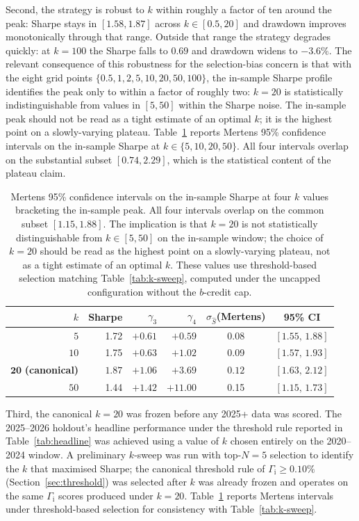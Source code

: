\documentclass[11pt]{article}
\theoremstyle{definition}
\theoremstyle{remark}
\newcommand{\GROUND}{\Gamma_{\mathrm{i}}}
\begin{document}
Second, the strategy is robust to $k$ within roughly a factor of
ten around the peak: Sharpe stays in $[1.58, 1.87]$ across $k
\in [0.5, 20]$ and drawdown improves monotonically through that
range. Outside that range the strategy degrades quickly: at $k =
100$ the Sharpe falls to $0.69$ and drawdown widens to $-3.6\%$.
The relevant consequence of this robustness for the
selection-bias concern is that with the eight grid points
$\{0.5, 1, 2, 5, 10, 20, 50, 100\}$, the in-sample Sharpe
profile identifies the peak only to within a factor of roughly
two: $k = 20$ is statistically indistinguishable from values in
$[5, 50]$ within the Sharpe noise. The in-sample peak should not
be read as a tight estimate of an optimal $k$; it is the highest
point on a slowly-varying plateau. Table~\ref{tab:k-mertens} reports
Mertens 95\% confidence intervals on the in-sample Sharpe at
$k \in \{5, 10, 20, 50\}$. All four intervals overlap on the
substantial subset $[0.74, 2.29]$, which is the statistical
content of the plateau claim.

\begin{table}[htbp]
\centering
\small
\begin{tabular}{rrrrcc}
\toprule
$k$ & Sharpe & $\gamma_3$ & $\gamma_4$ & $\sigma_{\hat S}$(Mertens) & 95\% CI \\
\midrule
$5$  & 1.72 & $+0.61$ & $+0.59$ & 0.08 & $[1.55,\,1.88]$ \\
$10$ & 1.75 & $+0.63$ & $+1.02$ & 0.09 & $[1.57,\,1.93]$ \\
$\mathbf{20}$ \textbf{(canonical)} & $\mathbf{1.87}$ & $\mathbf{+1.06}$ & $\mathbf{+3.69}$ & $\mathbf{0.12}$ & $\mathbf{[1.63,\,2.12]}$ \\
$50$ & 1.44 & $+1.42$ & $+11.00$ & 0.15 & $[1.15,\,1.73]$ \\
\bottomrule
\end{tabular}
\caption{Mertens 95\% confidence intervals on the in-sample Sharpe
at four $k$ values bracketing the in-sample peak. All four intervals
overlap on the common subset $[1.15, 1.88]$. The implication is
that $k = 20$ is not statistically distinguishable from $k \in
[5, 50]$ on the in-sample window; the choice of $k = 20$ should be
read as the highest point on a slowly-varying plateau, not as a
tight estimate of an optimal $k$. These values use threshold-based
selection matching Table~\ref{tab:k-sweep}, computed under the
uncapped configuration without the $b$-credit cap.}
\label{tab:k-mertens}
\end{table}

Third, the canonical $k = 20$ was frozen before any 2025+ data
was scored. The 2025--2026 holdout's headline performance under
the threshold rule reported in Table~\ref{tab:headline} was
achieved using a value of $k$ chosen entirely on the 2020--2024
window. A preliminary $k$-sweep was run with top-$N = 5$ selection
to identify the $k$ that maximised Sharpe; the canonical threshold
rule of $\GROUND \geq 0.10\%$ (Section~\ref{sec:threshold}) was
selected after $k$ was already frozen and operates on the same
$\GROUND$ scores produced under $k = 20$. Table~\ref{tab:k-mertens}
reports Mertens intervals under threshold-based selection for
consistency with Table~\ref{tab:k-sweep}.
\end{document}
